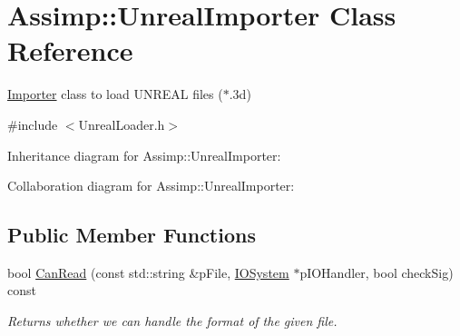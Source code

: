 \hypertarget{class_assimp_1_1_unreal_importer}{\section{Assimp\+:\+:Unreal\+Importer Class Reference}
\label{class_assimp_1_1_unreal_importer}
}


\hyperlink{class_assimp_1_1_importer}{Importer} class to load U\+N\+R\+E\+A\+L files ($\ast$.3d)  




{\ttfamily \#include $<$Unreal\+Loader.\+h$>$}



Inheritance diagram for Assimp\+:\+:Unreal\+Importer\+:


Collaboration diagram for Assimp\+:\+:Unreal\+Importer\+:
\subsection*{Public Member Functions}
\begin{DoxyCompactItemize}
\item 
bool \hyperlink{class_assimp_1_1_unreal_importer_a346ca2f9970112362de60301c17f6894}{Can\+Read} (const std\+::string \&p\+File, \hyperlink{class_assimp_1_1_i_o_system}{I\+O\+System} $\ast$p\+I\+O\+Handler, bool check\+Sig) const 
\begin{DoxyCompactList}\small\item\em Returns whether we can handle the format of the given file. \end{DoxyCompactList}\end{DoxyCompactItemize}
